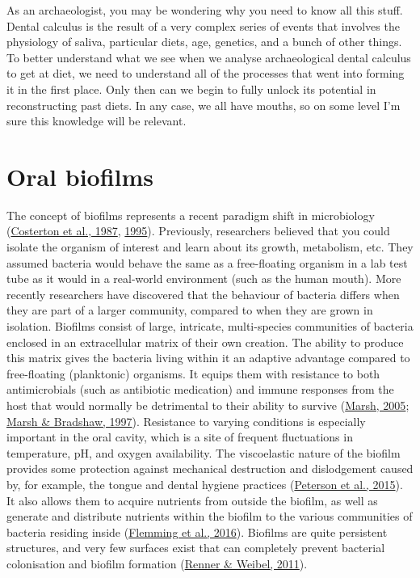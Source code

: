 \documentclass[
  b5paper,
]{book}
\begin{document}
As an archaeologist, you may be wondering why you need to know all this
stuff. Dental calculus is the result of a very complex series of events
that involves the physiology of saliva, particular diets, age, genetics,
and a bunch of other things. To better understand what we see when we
analyse archaeological dental calculus to get at diet, we need to
understand all of the processes that went into forming it in the first
place. Only then can we begin to fully unlock its potential in
reconstructing past diets. In any case, we all have mouths, so on some
level I'm sure this knowledge will be relevant.

\hypertarget{background-biofilms}{%
\section{Oral biofilms}\label{background-biofilms}}

The concept of biofilms represents a recent paradigm shift in
microbiology
(\protect\hyperlink{ref-costertonBacterialBiofilms1987}{Costerton et
al., 1987},
\protect\hyperlink{ref-costertonMicrobialBiofilms1995}{1995}).
Previously, researchers believed that you could isolate the organism of
interest and learn about its growth, metabolism, etc. They assumed
bacteria would behave the same as a free-floating organism in a lab test
tube as it would in a real-world environment (such as the human mouth).
More recently researchers have discovered that the behaviour of bacteria
differs when they are part of a larger community, compared to when they
are grown in isolation. Biofilms consist of large, intricate,
multi-species communities of bacteria enclosed in an extracellular
matrix of their own creation. The ability to produce this matrix gives
the bacteria living within it an adaptive advantage compared to
free-floating (planktonic) organisms. It equips them with resistance to
both antimicrobials (such as antibiotic medication) and immune responses
from the host that would normally be detrimental to their ability to
survive (\protect\hyperlink{ref-marshDentalPlaque2005}{Marsh, 2005};
\protect\hyperlink{ref-marshPhysiologicalApproaches1997}{Marsh \&
Bradshaw, 1997}). Resistance to varying conditions is especially
important in the oral cavity, which is a site of frequent fluctuations
in temperature, pH, and oxygen availability. The viscoelastic nature of
the biofilm provides some protection against mechanical destruction and
dislodgement caused by, for example, the tongue and dental hygiene
practices
(\protect\hyperlink{ref-petersonViscoelasticityBiofilms2015}{Peterson et
al., 2015}). It also allows them to acquire nutrients from outside the
biofilm, as well as generate and distribute nutrients within the biofilm
to the various communities of bacteria residing inside
(\protect\hyperlink{ref-flemmingBiofilmsEmergent2016}{Flemming et al.,
2016}). Biofilms are quite persistent structures, and very few surfaces
exist that can completely prevent bacterial colonisation and biofilm
formation
(\protect\hyperlink{ref-rennerPhysicochemicalRegulation2011}{Renner \&
Weibel, 2011}).
\end{document}
